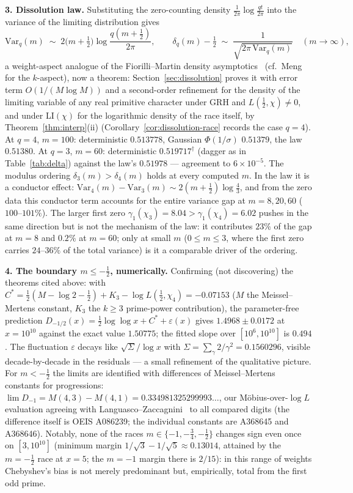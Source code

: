 \documentclass[11pt]{article}
\newcommand{\eps}{\varepsilon}
\newcommand{\loglog}{\log\log}
\begin{document}
\textbf{3. Dissolution law.} Substituting the zero-counting density
$\frac{1}{2\pi}\log\frac{qt}{2\pi}$ into the variance of the limiting
distribution gives
\[
\mathrm{Var}_q(m)\;\sim\;2\bigl(m+\tfrac12\bigr)
\log\frac{q(m+\tfrac12)}{2\pi},\qquad
\delta_q(m)-\tfrac12\;\sim\;\frac{1}{\sqrt{2\pi\,\mathrm{Var}_q(m)}}
\quad(m\to\infty),
\]
a weight-aspect analogue of the Fiorilli--Martin density
asymptotics~\cite{FM13} (cf.\ Meng~\cite{Meng18} for the $k$-aspect),
now a theorem: Section~\ref{sec:dissolution} proves it with error term
$O(1/(M\log M))$ and a second-order refinement for the density of the
limiting variable of any real primitive character under GRH and
$L(\tfrac12,\chi)\ne0$, and under LI$(\chi)$ for the logarithmic
density of the race itself, by Theorem~\ref{thm:interp}(ii)
(Corollary~\ref{cor:dissolution-race} records the case $q=4$).
At $q=4$, $m=100$: deterministic $0.513778$, Gaussian $\Phi(1/\sigma)$
$0.51379$, the law $0.51380$. At $q=3$, $m=60$: deterministic
$0.519717^{\dagger}$ (dagger as in Table~\ref{tab:delta})
against the law's $0.51978$ --- agreement to $6\times10^{-5}$. The modulus ordering
$\delta_3(m)>\delta_4(m)$ holds at every computed $m$. In the law it is
a conductor effect: $\mathrm{Var}_4(m)-\mathrm{Var}_3(m)\sim
2(m+\tfrac12)\log\tfrac43$, and from the zero data this conductor term
accounts for the entire variance gap at $m=8,20,60$
($100$--$101\%$). The larger first zero
$\gamma_1(\chi_3)=8.04>\gamma_1(\chi_4)=6.02$ pushes in the same
direction but is not the mechanism of the law: it contributes $23\%$ of
the gap at $m=8$ and $0.2\%$ at $m=60$; only at small $m$ ($0\le m\le3$,
where the first zero carries $24$--$36\%$ of the total variance) is it
a comparable driver of the ordering.

\textbf{4. The boundary $m\le-\tfrac12$, numerically.} Confirming (not
discovering) the theorems cited above: with
$C^*=\tfrac12(M-\log 2-\tfrac12)+K_3-\log L(\tfrac12,\chi_4)
=-0.07153$ ($M$ the Meissel--Mertens constant, $K_3$ the $k\ge3$
prime-power contribution), the parameter-free prediction
$D_{-1/2}(x)=\tfrac12\loglog x+C^*+\eps(x)$ gives $1.4968\pm0.0172$
at $x=10^{10}$ against the exact value $1.50775$; the fitted slope
over $[10^6,10^{10}]$ is $0.494$. The fluctuation $\eps$ decays like
$\sqrt{\Sigma}/\log x$ with $\Sigma=\sum_\gamma2/\gamma^2=0.1560296$,
visible decade-by-decade in the residuals --- a small refinement of
the qualitative picture. For $m<-\tfrac12$ the limits are identified
with differences of Meissel--Mertens constants for progressions:
$\lim D_{-1}=M(4,3)-M(4,1)=0.334981325299993\ldots$, our
M\"obius-over-$\log L$ evaluation agreeing with
Languasco--Zaccagnini~\cite{LZ10} to all compared digits (the
difference itself is OEIS A086239; the individual constants are
A368645 and A368646). Notably, none of the races $m\in\{-1,-\tfrac34,
-\tfrac12\}$ changes sign even once on $[3,10^{10}]$ (minimum margin
$1/\sqrt3-1/\sqrt5\approx0.13014$, attained by the $m=-\tfrac12$ race
at $x=5$; the $m=-1$ margin there is $2/15$): in this range of weights Chebyshev's bias is not
merely predominant but, empirically, total from the first odd prime.
\end{document}
